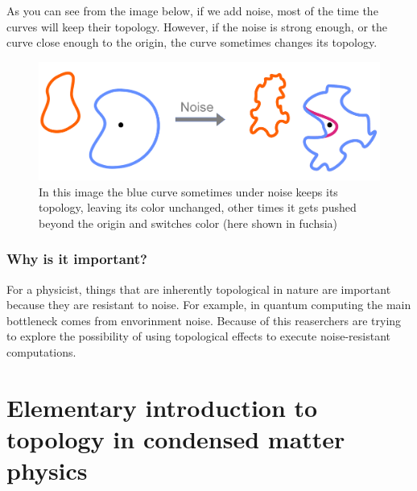 As you can see from the image below, if we add noise, most of the time the curves will keep their topology. However, if the noise is strong enough, or the curve close enough to the origin, the curve sometimes changes its topology.
\begin{figure}[h]
    \includegraphics[width=\linewidth]{Immagini/topo/topo2.pdf}
    \caption{In this image the blue curve sometimes under noise keeps its topology, leaving its color unchanged, other times it gets pushed beyond the origin and switches color  (here shown in fuchsia)
    }
    \label{fig:topo2}
\end{figure}

\subsubsection*{Why is it important?}
For a physicist, things that are inherently topological in nature are important because they are resistant to noise. For example, in quantum computing the main bottleneck comes from envorinment noise. Because of this reaserchers are trying to explore the possibility of using topological effects to execute noise-resistant computations.




\section{Elementary introduction to topology in condensed matter physics}
    
